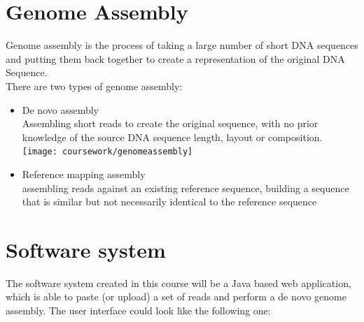 \section{Genome Assembly}
Genome assembly is the process of taking a large number of short
DNA sequences and putting them back together to create a representation
of the original DNA Sequence.\\
There are two types of genome assembly:
\begin{itemize}
\item De novo assembly\\
Assembling short reads to create the original sequence, with
no prior knowledge of the source DNA sequence length, layout or composition.\\
\texttt{[image: coursework/genomeassembly]}
\item Reference mapping assembly\\
assembling reads against an existing reference sequence, building a sequence
that is similar but not necessarily identical to the reference sequence
\end{itemize}

\section{Software system}
The software system created in this course will be a Java based
web application, which is able to paste (or upload) a set of
reads and perform a de novo genome assembly. The user interface could
look like the following one:
